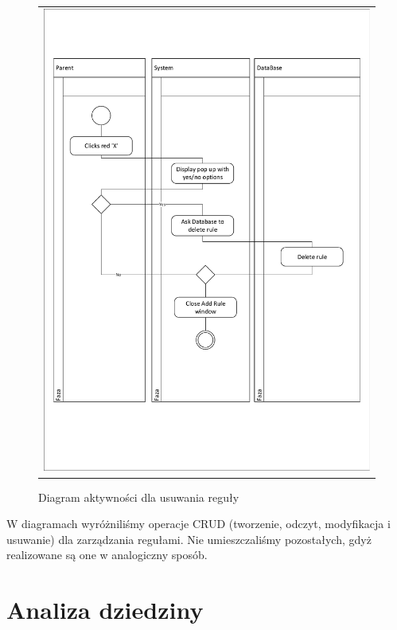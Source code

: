 \documentclass{sprawozdanie-agh}
\begin{document}
			\begin{figure}[H]
				\centering
				\begin{tabular}{c}
					\includegraphics[width=.95\textwidth]{crudDelete} 
				\end{tabular}
			\caption{Diagram aktywności dla usuwania reguły}
			\end{figure}

			W diagramach wyróżniliśmy operacje CRUD (tworzenie, odczyt, modyfikacja i usuwanie) dla zarządzania regułami. Nie umieszczaliśmy pozostałych, gdyż realizowane są one w analogiczny sposób.

	\section{Analiza dziedziny}
\end{document}
